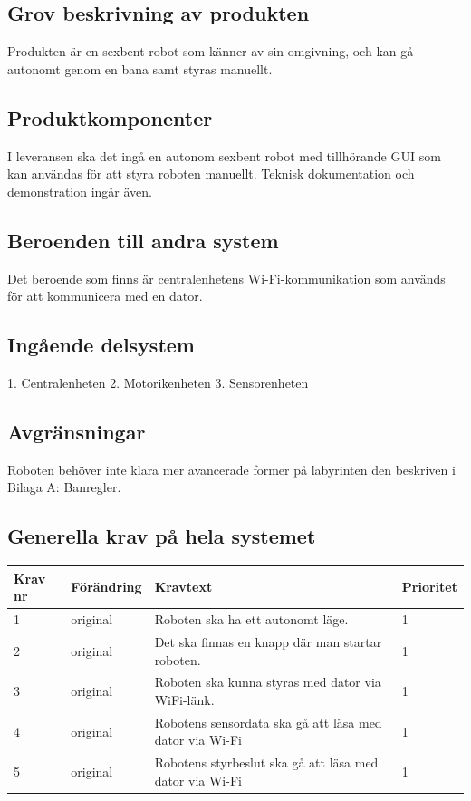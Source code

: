 \documentclass[a4paper,titlepage,12pt]{article}
\begin{document}
	\subsection{Grov beskrivning av produkten}
	Produkten är en sexbent robot som känner av sin omgivning, och kan gå autonomt
	genom en bana samt styras manuellt.
	\subsection{Produktkomponenter}
	I leveransen ska det ingå en autonom sexbent robot med tillhörande GUI som kan användas för att 
	styra roboten manuellt. Teknisk dokumentation och demonstration ingår även. 
	\subsection{Beroenden  till andra system}
	Det beroende som finns är centralenhetens Wi-Fi-kommunikation som används för 
	att kommunicera med en dator.
	\subsection{Ingående delsystem}
	1. Centralenheten
	2. Motorikenheten
	3. Sensorenheten
	\subsection{Avgränsningar}
	Roboten behöver inte klara mer avancerade former på labyrinten den beskriven i Bilaga A: Banregler.
	\subsection{Generella krav på hela systemet}

	\begin{table}[h!]
		\label{tab:label}
		\begin{tabularx}{\textwidth}{|l|l|X|l|}
		\hline
			\textbf{Krav nr} & \textbf{Förändring} & \textbf{Kravtext} & \textbf{Prioritet} 
				\\ \hline
	
			1 & original & Roboten ska ha ett autonomt läge. & 1
					\\ \hline

			2 & original & Det ska finnas en knapp där man startar roboten. & 1
				\\ \hline

			3 & original & Roboten ska kunna styras med dator via WiFi-länk. & 1
				\\ \hline
		
			4 & original & Robotens sensordata ska gå att läsa med dator via Wi-Fi & 1
				\\ \hline

			5 & original & Robotens styrbeslut ska gå att läsa med dator via Wi-Fi & 1
				\\ \hline
		\end{tabularx}
	\end{table}
\end{document}
